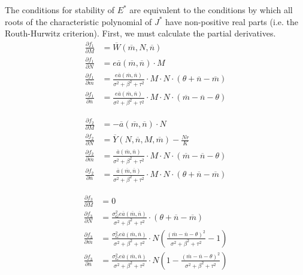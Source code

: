 \documentclass[10pt]{beamer}
\begin{document}
\noindent The conditions for stability of $E^*$ are equivalent to the conditions by which all roots of the characteristic polynomial of $J^*$ have non-positive real parts (i.e. the Routh-Hurwitz criterion).  First, we must calculate the partial derivatives. \\
\begin{align*}
	\frac{\partial f_1}{\partial M} &= \overline{W}(\overline{m}, N, \overline{n}) \\[.15cm]
	\frac{\partial f_1}{\partial N} &= e\overline{a}(\overline{m}, \overline{n}) \cdot M \\[.15cm]
	\frac{\partial f_1}{\partial \overline{m}} &= \frac{e\overline{a}(\overline{m}, \overline{n})}{\sigma^2 + \beta^2 + \tau^2} \cdot M \cdot N \cdot (\theta + \overline{n} - \overline{m}) \\[.15cm]
	\frac{\partial f_1}{\partial \overline{n}} &= \frac{e\overline{a}(\overline{m}, \overline{n})}{\sigma^2 + \beta^2 + \tau^2} \cdot M \cdot N \cdot (\overline{m} - \overline{n} - \theta)
\end{align*}

\begin{align*}
	\frac{\partial f_2}{\partial M} &= -\overline{a}(\overline{m}, \overline{n}) \cdot N \\[.15cm]
	\frac{\partial f_2}{\partial N} &= \overline{Y}(N, \overline{n}, M, \overline{m})  - \frac{Nr}{K} \\[.15cm]
	\frac{\partial f_2}{\partial \overline{m}} &= \frac{\overline{a}(\overline{m}, \overline{n})}{\sigma^2 + \beta^2 + \tau^2} \cdot M \cdot N \cdot (\overline{m} - \overline{n} - \theta) \\[.15cm]
	\frac{\partial f_2}{\partial \overline{n}} &= \frac{\overline{a}(\overline{m}, \overline{n})}{\sigma^2 + \beta^2 + \tau^2} \cdot M \cdot N \cdot (\theta + \overline{n} - \overline{m})
\end{align*}

\begin{align*}
	\frac{\partial f_3}{\partial M} &= 0 \\[.15cm]
	\frac{\partial f_3}{\partial N} &= \frac{\sigma_G^2e\overline{a}(\overline{m}, \overline{n})}{\sigma^2 + \beta^2 + \tau^2} \cdot (\theta + \overline{n} - \overline{m}) \\[.15cm]
	\frac{\partial f_3}{\partial \overline{m}} &= \frac{\sigma_G^2e\overline{a}(\overline{m}, \overline{n})}{\sigma^2 + \beta^2 + \tau^2} \cdot N\left(\frac{(\overline{m} - \overline{n} - \theta)^2}{\sigma^2 + \beta^2 + \tau^2} -1\right) \\[.15cm]
	\frac{\partial f_3}{\partial \overline{n}} &= \frac{\sigma_G^2e\overline{a}(\overline{m}, \overline{n})}{\sigma^2 + \beta^2 + \tau^2} \cdot N\left(1- \frac{(\overline{m} - \overline{n} - \theta)^2}{\sigma^2 + \beta^2 + \tau^2} \right)
\end{align*}
\end{document}
